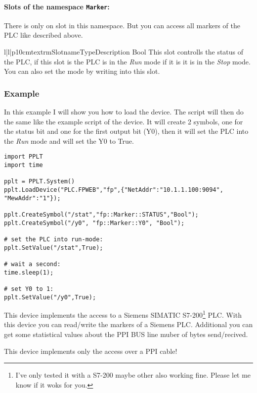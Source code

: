\paragraph{Slots of the namespace \texttt{Marker}:}
There is only on slot in this namespace. But you can access all markers 
of the PLC like described above.
\begin{tableiii}{l|l|p{10cm}}{textrm}{Slotname}{Type}{Description}
        {Bool}
        {This slot controlls the status of the PLC, if this slot is 
         the PLC is in the \emph{Run} mode if it is
         it is in the \emph{Stop} mode. You can also
        set the mode by writing into this slot.}
\end{tableiii}

\subsubsection{Example}
In this example I will show you how to load the  device.
The script will then do the same like the example script of the 
 device. It will create 2 symbols, one for
the status bit and one for the first output bit (Y0), then it will
set the PLC into the \emph{Run} mode and will set the Y0 to True.

\begin{verbatim}
import PPLT
import time

pplt = PPLT.System()
pplt.LoadDevice("PLC.FPWEB","fp",{"NetAddr":"10.1.1.100:9094", "MewAddr":"1"});

pplt.CreateSymbol("/stat","fp::Marker::STATUS","Bool");
pplt.CreateSymbol("/y0", "fp::Marker::Y0", "Bool");

# set the PLC into run-mode:
pplt.SetValue("/stat",True);

# wait a second:
time.sleep(1);

# set Y0 to 1:
pplt.SetValue("/y0",True);
\end{verbatim}






This device implements the access to a Siemens SIMATIC 
S7-200\footnote{I've only tested it with a S7-200 maybe other also working 
fine. Please let me know if it woks for you.} PLC. With this device you can 
read/write the markers of a Siemens PLC. Additional you can get some 
statistical values about the PPI BUS line muber of bytes send/recived.
\begin{notice}
This device implements only the access over a PPI cable!
\end{notice}


